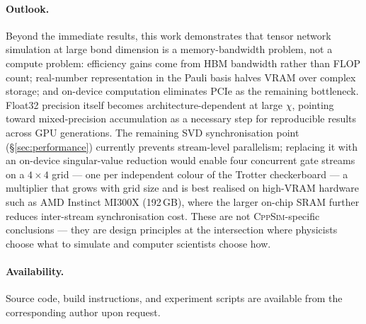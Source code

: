 \documentclass[11pt]{article}
\begin{document}
\paragraph{Outlook.}
Beyond the immediate results, this work demonstrates that tensor network simulation
at large bond dimension is a memory-bandwidth problem, not a compute problem:
efficiency gains come from HBM bandwidth rather than FLOP count; real-number
representation in the Pauli basis halves VRAM over complex storage; and on-device
computation eliminates PCIe as the remaining bottleneck.
Float32 precision itself becomes architecture-dependent at large $\chi$, pointing
toward mixed-precision accumulation as a necessary step for reproducible results
across GPU generations.
The remaining SVD synchronisation point (\S\ref{sec:performance}) currently
prevents stream-level parallelism; replacing it with an on-device singular-value
reduction would enable four concurrent gate streams on a $4\times4$ grid ---
one per independent colour of the Trotter checkerboard --- a multiplier that
grows with grid size and is best realised on high-VRAM hardware such as
AMD Instinct MI300X (192\,GB), where the larger on-chip SRAM further reduces
inter-stream synchronisation cost.
These are not \textsc{CppSim}-specific conclusions --- they are design principles
at the intersection where physicists choose what to simulate and computer scientists
choose how.

\paragraph{Availability.}
Source code, build instructions, and experiment scripts are available from
the corresponding author upon request.
\end{document}
